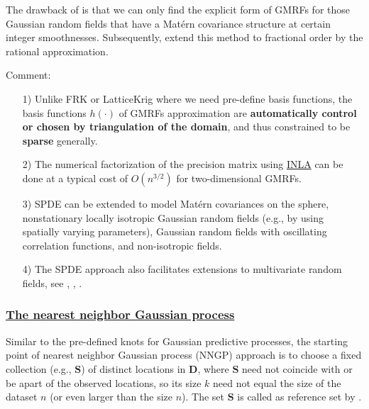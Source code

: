 \documentclass[
12pt, %
a4paper, %
oneside, %
headinclude,footinclude, %
BCOR5mm, %
]{scrartcl}
\begin{document}
The drawback of \href{https://chenyw68.github.io/Literature/[2011]An explicit link between GF and GMRFs the SPDE approach.pdf}{\citet{lindgren2011explicit}} is that we can only find the explicit form of GMRFs for those Gaussian random fields that have a Matérn covariance structure at certain integer smoothnesses. Subsequently, \href{https://chenyw68.github.io/Literature/https://chenyw68.github.io/Literature/[2020]The Rational SPDE Approach for Gaussian Random Fields With General Smoothness.pdf}{\cite{bolin2020rational}} extend this method to fractional order by the rational approximation.

\textcolor[rgb]{1.00,0.00,1.00}{Comment:}
\begin{itemize}
\item [1)]Unlike FRK or LatticeKrig where we need pre-define basis functions, the basis functions $h(\cdot)$ of GMRFs approximation are  \textbf{automatically control or chosen by triangulation of the domain}, and thus constrained to be \textbf{sparse} generally.
\item [2)]The numerical factorization of the precision matrix using \href{http://www.r-inla.org/}{INLA} can be done at a typical cost of $O(n^{3/2})$ for two-dimensional GMRFs.
\item [3)]SPDE can be extended to model Matérn covariances on the sphere, nonstationary locally isotropic Gaussian random fields (e.g., by
using spatially varying parameters), Gaussian random fields with oscillating correlation functions, and non-isotropic fields.
\item [4)]The SPDE approach also facilitates extensions to multivariate random fields, see \href{https://chenyw68.github.io/Literature/[2013] Multivariate Gaussian random fields using systems of stochastic partial differential equations.pdf}{\cite{hu2013multivariate}}, \href{https://chenyw68.github.io/Literature/[2016]Spatial modeling with system of stochastic partial differential equations.pdf}{\cite{hu2016spatial}}, \href{https://chenyw68.github.io/Literature/[2020]Multivariate type G Matern stochastic partial differential equation random fields.pdf}{\cite{bolin2020multivariate}}.
\end{itemize}

\subsubsection{\href{https://chenyw68.github.io/Literature[2020]spNNGP R package for Nearest Neighbor Gaussian Process models.pdf}{The nearest neighbor Gaussian process}}
Similar to the pre-defined knots for Gaussian predictive processes, the starting point of nearest neighbor Gaussian process (NNGP) approach is to choose a fixed collection (e.g.,  $\boldsymbol{S}$) of distinct locations in $\boldsymbol{D}$, where $\boldsymbol{S}$ need not coincide with or be apart of the
observed locations, so its size $k$ need not equal the size of the dataset $n$ (or \textcolor[rgb]{0.50,0.50,0.50}{even larger than the size $n$}). The set $\boldsymbol{S}$ is called as reference set by
\href{https://chenyw68.github.io/Literature/[2016]Hierarchical nearest-neighbor Gaussian process models for large geostatistical datasets.pdf}{\cite{datta2016hierarchical}}.
\end{document}
